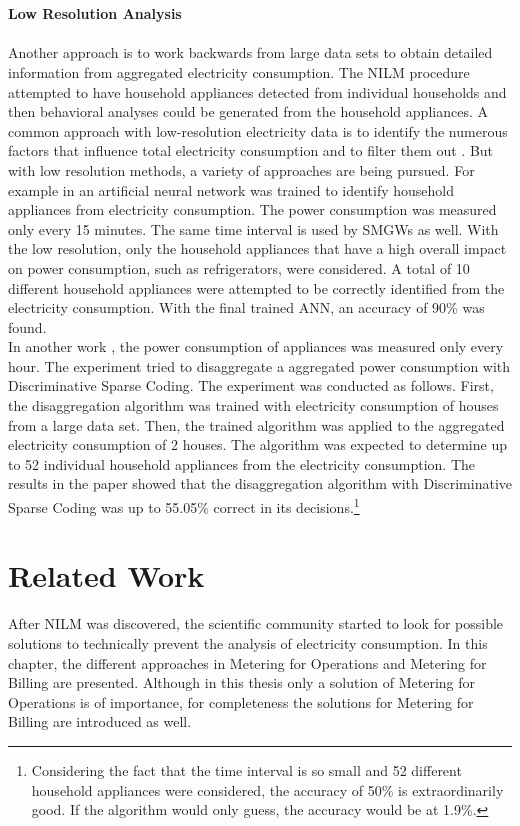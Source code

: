 \\
\\
\textbf{Low Resolution Analysis}
\label{subsec:low_reso}
\\
\\Another approach is to work backwards from large data sets to obtain detailed information from aggregated electricity consumption. The \gls{NILM} procedure attempted to have household appliances detected from individual households and then behavioral analyses could be generated from the household appliances. A common approach with low-resolution electricity data is to identify the numerous factors that influence total electricity consumption and to filter them out \cite{quinn2009privacy}.
But with low resolution methods, a variety of approaches are being pursued.
For example in \cite{prudenzi2002neuron} an artificial neural network was trained to identify household appliances from electricity consumption. The power consumption was measured only every 15 minutes. The same time interval is used by \gls{SMGW}s as well. With the low resolution, only the household appliances that have a high overall impact on power consumption, such as refrigerators, were considered. A total of 10 different household appliances were attempted to be correctly identified from the electricity consumption. With the final trained ANN, an accuracy of 90\% was found.
\\%
In another work \cite{kolter2010energy}, the power consumption of appliances was measured only every hour. The experiment tried to disaggregate a aggregated power consumption with Discriminative Sparse Coding. The experiment was conducted as follows. First, the disaggregation algorithm was trained with electricity consumption of houses from a large data set. Then, the trained algorithm was applied to the aggregated electricity consumption of 2 houses. The algorithm was expected to determine up to 52 individual household appliances from the electricity consumption. The results in the paper showed that the disaggregation algorithm with Discriminative Sparse Coding was up to 55.05\% correct in its decisions.\footnote[2]{Considering the fact that the time interval is so small and 52 different household appliances were considered, the accuracy of 50\% is extraordinarily good. If the algorithm would only guess, the accuracy would be at 1.9\%.}

\section{Related Work}
After \gls{NILM} was discovered, the scientific community started to look for possible solutions to technically prevent the analysis of electricity consumption. In this chapter, the different approaches in Metering for Operations and Metering for Billing are presented. Although in this thesis only a solution of Metering for Operations is of importance, for completeness the solutions for Metering for Billing are introduced as well.
